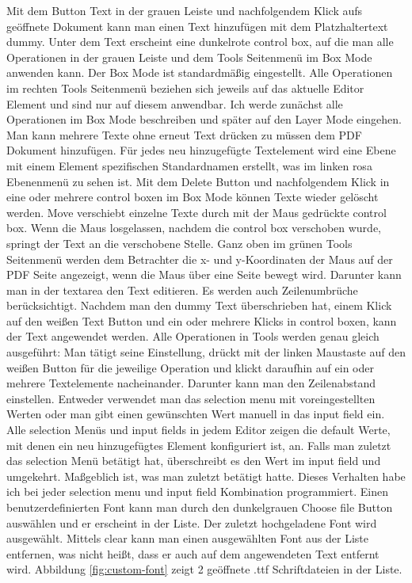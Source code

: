 Mit dem Button Text in der grauen Leiste und nachfolgendem Klick aufs geöffnete Dokument kann man einen Text hinzufügen mit dem Platzhaltertext dummy. Unter dem Text erscheint eine dunkelrote control box, auf die man alle Operationen in der grauen Leiste und dem Tools Seitenmenü im Box Mode anwenden kann. Der Box Mode ist standardmäßig eingestellt. Alle Operationen im rechten Tools Seitenmenü beziehen sich jeweils auf das aktuelle Editor Element und sind nur auf diesem anwendbar. Ich werde zunächst alle Operationen im Box Mode beschreiben und später auf den Layer Mode eingehen. Man kann mehrere Texte ohne erneut Text drücken zu müssen dem PDF Dokument hinzufügen. Für jedes neu hinzugefügte Textelement wird eine Ebene mit einem  Element spezifischen Standardnamen erstellt, was im linken rosa Ebenenmenü zu sehen ist. Mit dem Delete Button und nachfolgendem Klick in eine oder mehrere control boxen im Box Mode können Texte wieder gelöscht werden. Move verschiebt einzelne Texte durch mit der Maus gedrückte control box. Wenn die Maus losgelassen, nachdem die control box verschoben wurde, springt der Text an die verschobene Stelle. Ganz oben im grünen Tools Seitenmenü werden dem Betrachter die x- und y-Koordinaten der Maus auf der PDF Seite angezeigt, wenn die Maus über eine Seite bewegt wird. Darunter kann man in der textarea den Text editieren. Es werden auch Zeilenumbrüche berücksichtigt. Nachdem man den dummy Text überschrieben hat, einem Klick auf den weißen Text Button und ein oder mehrere Klicks in control boxen, kann der Text angewendet werden. Alle Operationen in Tools werden genau gleich ausgeführt: Man tätigt seine Einstellung, drückt mit der linken Maustaste auf den weißen Button für die jeweilige Operation und klickt daraufhin auf ein oder mehrere Textelemente nacheinander. Darunter kann man den Zeilenabstand einstellen. Entweder verwendet man das selection menu mit voreingestellten Werten oder man gibt einen gewünschten Wert manuell in das input field ein. Alle selection Menüs und input fields in jedem Editor zeigen die default Werte, mit denen ein neu hinzugefügtes Element konfiguriert ist, an. Falls man zuletzt das selection Menü betätigt hat, überschreibt es den Wert im input field und umgekehrt. Maßgeblich ist, was man zuletzt betätigt hatte. Dieses Verhalten habe ich bei jeder selection menu und input field Kombination programmiert. Einen benutzerdefinierten Font kann man durch den dunkelgrauen Choose file Button auswählen und er erscheint in der Liste. Der zuletzt hochgeladene Font wird ausgewählt. Mittels clear kann man einen ausgewählten Font aus der Liste entfernen, was nicht heißt, dass er auch auf dem angewendeten Text entfernt wird. Abbildung \ref{fig:custom-font} zeigt 2 geöffnete .ttf Schriftdateien in der Liste.

